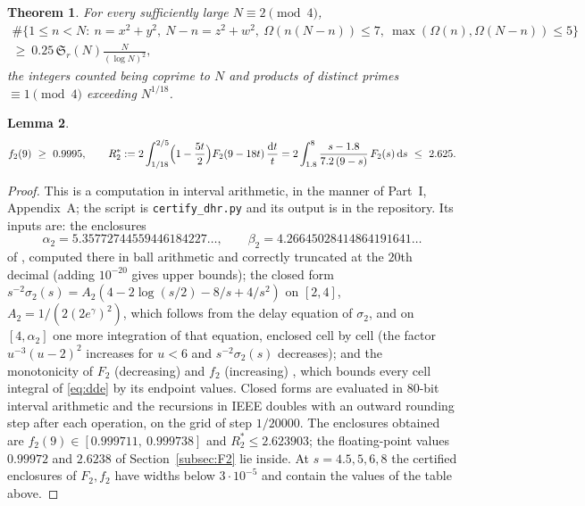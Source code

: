 ﻿\documentclass[11pt]{amsart}
\newtheorem{theorem}{Theorem}[section]
\newtheorem{lemma}[theorem]{Lemma}
\theoremstyle{remark}
\newcommand{\Sg}{\mathfrak{S}}
\newcommand{\dd}{\mathrm{d}}
\begin{document}
\begin{theorem}\label{thm:dim2}
For every sufficiently large $N\equiv2\pmod4$,
\begin{multline*}
\#\bigl\{1\le n<N:\ n=x^2+y^2,\ N-n=z^2+w^2,\ \Omega(n(N-n))\le7,\ \max(\Omega(n),\Omega(N-n))\le5\bigr\}\\
\ge\ 0.25\,\Sg_r(N)\frac{N}{(\log N)^2},
\end{multline*}
the integers counted being coprime to $N$ and products of distinct primes $\equiv1\pmod4$ exceeding $N^{1/18}$.
\end{theorem}

\begin{lemma}\label{lem:cert}
\begin{equation}\label{eq:dim2cond}
f_2(9)\ \ge\ 0.9995,\qquad R_2^*:=2\int_{1/18}^{2/5}\Bigl(1-\frac{5t}2\Bigr)F_2(9-18t)\,\frac{\dd t}t=2\int_{1.8}^{8}\frac{s-1.8}{7.2\,(9-s)}\,F_2(s)\,\dd s\ \le\ 2.625 .
\end{equation}
\end{lemma}
\begin{proof}
This is a computation in interval arithmetic, in the manner of Part~I, Appendix~A; the script is \texttt{certify\_dhr.py} and its output is in the repository. Its inputs are: the enclosures
\[
\alpha_2=5.35772744559446184227\ldots,\qquad \beta_2=4.26645028414864191641\ldots
\]
of \cite{BB}, computed there in ball arithmetic and correctly truncated at the $20$th decimal (adding $10^{-20}$ gives upper bounds); the closed form $s^{-2}\sigma_2(s)=A_2(4-2\log(s/2)-8/s+4/s^2)$ on $[2,4]$, $A_2=1/(2(2e^\gamma)^2)$, which follows from the delay equation of $\sigma_2$, and on $[4,\alpha_2]$ one more integration of that equation, enclosed cell by cell (the factor $u^{-3}(u-2)^2$ increases for $u<6$ and $s^{-2}\sigma_2(s)$ decreases); and the monotonicity of $F_2$ (decreasing) and $f_2$ (increasing) \cite[Lemma~6.2]{DH}, which bounds every cell integral of \eqref{eq:dde} by its endpoint values. Closed forms are evaluated in $80$-bit interval arithmetic and the recursions in IEEE doubles with an outward rounding step after each operation, on the grid of step $1/20000$. The enclosures obtained are $f_2(9)\in[0.999711,\ 0.999738]$ and $R_2^*\le2.623903$; the floating-point values $0.99972$ and $2.6238$ of Section~\ref{subsec:F2} lie inside. At $s=4.5,5,6,8$ the certified enclosures of $F_2,f_2$ have widths below $3\cdot10^{-5}$ and contain the values of the table above.
\end{proof}
\end{document}
